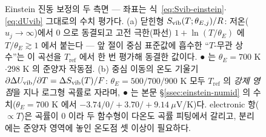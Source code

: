 \begin{figure}[t]
\caption{Einstein 진동 보정의 두 측면 --- 좌표는 식~\eqref{eq:Svib-einstein}$\cdot$\eqref{eq:dUvib}
그대로의 수치 평가다. (a) 닫힌형 $S_{\mathrm{vib}}(T;\theta_{E,j})/R$: 저온($u_j\to\infty$)에서 $0$ 으로
동결되고 고전 극한(파선) $1+\ln(T/\theta_E)$ 에 $T/\theta_E\gtrsim1$ 에서 붙는다 --- 앞 절이 중심
표준값에 흡수한 ``$T$-무관 상수''는 이 곡선을 $T_\mathrm{ref}$ 에서 한 번 평가해 동결한 값이다.
● 는 $\theta_E{=}700$ K$\cdot$$298$ K 의 준양자 작동점. (b) 중심 이동의 온도 기울기
$\partial\Delta U_{\mathrm{vib}}/\partial T=\Delta S_{\mathrm{vib}}(T)/F$: $\theta_{E}{=}500/700/900$ K 모두
$T_\mathrm{ref}$ 의 \emph{강제 영점}을 지나 로그형 곡률로 자라며, ● 는 본문 \S\ref{ssec:einstein-numid}
의 수치($\theta_E{=}700$ K 에서 $-3.74/0/+3.70/+9.14\ \mu$V/K)다. electronic 항($\propto T$)은 곡률이 $0$
이라 두 함수형이 다온도 곡률 피팅에서 갈리고, 분리에는 준양자 영역에 놓인 온도점 셋 이상이 필요하다.}
\label{fig:svibid}
\end{figure}

